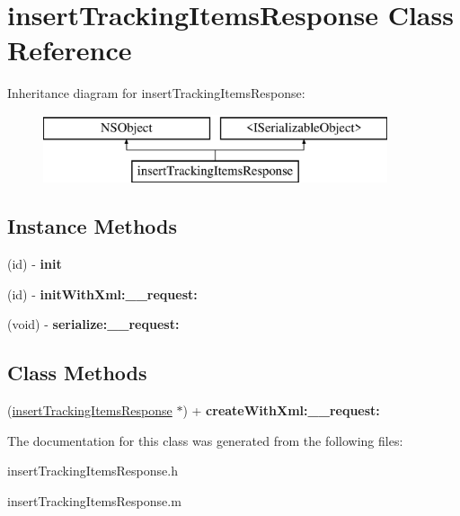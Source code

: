 \hypertarget{interfaceinsert_tracking_items_response}{}\section{insert\+Tracking\+Items\+Response Class Reference}
\label{interfaceinsert_tracking_items_response}
Inheritance diagram for insert\+Tracking\+Items\+Response\+:\begin{figure}[H]
\begin{center}
\leavevmode
\includegraphics[height=2.000000cm]{interfaceinsert_tracking_items_response}
\end{center}
\end{figure}
\subsection*{Instance Methods}
\begin{DoxyCompactItemize}
\item 
\hypertarget{interfaceinsert_tracking_items_response_a343d1ea09c40d4cd5adbaed7f70555f9}{}(id) -\/ {\bfseries init}\label{interfaceinsert_tracking_items_response_a343d1ea09c40d4cd5adbaed7f70555f9}

\item 
\hypertarget{interfaceinsert_tracking_items_response_aaed2c5b63fe804ab5d5ced4492289452}{}(id) -\/ {\bfseries init\+With\+Xml\+:\+\_\+\+\_\+request\+:}\label{interfaceinsert_tracking_items_response_aaed2c5b63fe804ab5d5ced4492289452}

\item 
\hypertarget{interfaceinsert_tracking_items_response_ae25853768d9f5e739a202dddf07e5661}{}(void) -\/ {\bfseries serialize\+:\+\_\+\+\_\+request\+:}\label{interfaceinsert_tracking_items_response_ae25853768d9f5e739a202dddf07e5661}

\end{DoxyCompactItemize}
\subsection*{Class Methods}
\begin{DoxyCompactItemize}
\item 
\hypertarget{interfaceinsert_tracking_items_response_a1e9f210699a6297b3473374044d29e95}{}(\hyperlink{interfaceinsert_tracking_items_response}{insert\+Tracking\+Items\+Response} $\ast$) + {\bfseries create\+With\+Xml\+:\+\_\+\+\_\+request\+:}\label{interfaceinsert_tracking_items_response_a1e9f210699a6297b3473374044d29e95}

\end{DoxyCompactItemize}


The documentation for this class was generated from the following files\+:\begin{DoxyCompactItemize}
\item 
insert\+Tracking\+Items\+Response.\+h\item 
insert\+Tracking\+Items\+Response.\+m\end{DoxyCompactItemize}
